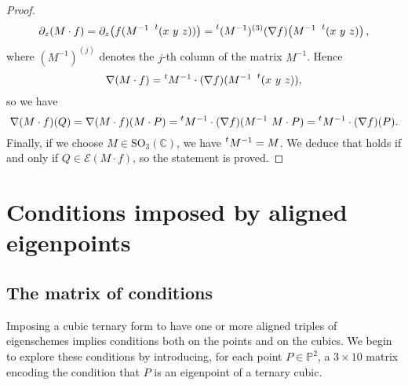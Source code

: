 \documentclass{amsart}
\theoremstyle{plain}
\theoremstyle{definition}
\newcommand{\p}{\mathbb{P}}
\newcommand{\Eig}[1]{\mathcal{E}\!\left( {#1} \right)}
\begin{document}
\begin{proof}
\begin{gather*}
\partial_z (M\cdot f) = \partial_z  \bigl( f(M^{-1}  \ \prescript{t} {} (x \ y \ z)) \bigr) = \prescript{t} {}(M^{-1})^{(3)}(\nabla f) \bigl( M^{-1}\   \prescript{t} {} (x \ y \ z) \bigr) \,,
\end{gather*}
%
where $(M^{-1})^{(j)}$ denotes the $j$-th column of the matrix $M^{-1}$. Hence
%
\[
\nabla (M \cdot f) = \prescript{t} {} M^{-1} \cdot (\nabla f) (M^{-1}\   \prescript{t} {} (x \ y \ z)),
\]
%
so we have
%
\[
\nabla (M \cdot f)(Q)=\nabla (M \cdot f)(M \cdot P)=
\prescript{t} {} M^{-1} \cdot (\nabla f) (M^{-1}\   M \cdot P)=\prescript{t} {} M^{-1} \cdot (\nabla f)(P).
\]
%
Finally, if we choose $M \in \mathrm{SO}_3(\mathbb{C})$, we have
$\prescript{t} {} M^{-1}=M$. We deduce that
 holds if and only if $Q \in \Eig{M\cdot f}$, so the statement is proved.
\end{proof}

\section{Conditions imposed by aligned eigenpoints}
\label{conditions}

\subsection{The matrix of conditions}

Imposing a cubic ternary form to have one or more aligned triples of eigenschemes implies conditions both on the points and on the cubics.
We begin to explore these conditions by introducing, for each point
$P \in \p^2$,
a $3 \times 10$ matrix encoding the condition that $P$ is an eigenpoint of a ternary cubic.
\end{document}
